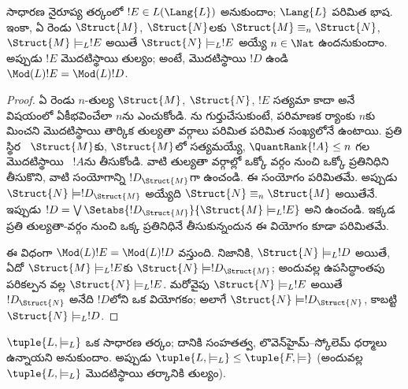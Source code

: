 \documentclass[../../../include/open-logic-section]{subfiles}
\begin{document}


\begin{lem}
సాధారణ నైరూప్య తర్కంలో $!E\in L(\Lang{L})$
అనుకుందాం; $\Lang{L}$ పరిమిత భాష. ఇంకా, ఏ రెండు
 $\Struct{M}$, $\Struct{N}$లకు
$\Struct{M}\equiv_n\Struct{N}$, $\Struct{M}\models_L!E$ అయితే
$\Struct{N}\models_L!E$ అయ్యే $n\in\Nat$ ఉందనుకుందాం. అప్పుడు $!E$
మొదటిస్థాయి  తుల్యం; అంటే,
మొదటిస్థాయి $!D$ ఉండి $\Mod(L){!E}=\Mod(L){!D}$.
\end{lem}

\begin{proof}
ఏ రెండు $n$-తుల్య 
$\Struct{M}$, $\Struct{N}$, $!E$ సత్యమా కాదా అనే విషయంలో
ఏకీభవించేలా $n$ను ఎంచుకోండి. ను
గుర్తుచేసుకుంటే, పరిమాణక ర్యాంకు $n$కు మించని మొదటిస్థాయి
 తార్కిక తుల్యతా వర్గాలు పరిమిత  పరిమిత సంఖ్యలోనే ఉంటాయి. ప్రతి స్థిర
~$\Struct{M}$కు, $\Struct{M}$లో
సత్యమయ్యే, $\QuantRank{!A}\le n$ గల మొదటిస్థాయి
~$!A$ను తీసుకోండి. వాటి తుల్యతా వర్గాల్లో
ఒక్కో వర్గం నుంచి ఒక్కో ప్రతినిధిని తీసుకొని, వాటి సంయోగాన్ని $!D_{\Struct{M}}$గా ఉంచండి.
ఈ సంయోగం పరిమితమే. అప్పుడు $\Struct{N}\models!D_{\Struct{M}}$
అయ్యేది $\Struct{N}\equiv_n\Struct{M}$ అయితేనే.
ఇప్పుడు $!D=\textstyle\bigvee
\Setabs{!D_{\Struct{M}}}{\Struct{M}\models_L!E}$ అని ఉంచండి. ఇక్కడ
ప్రతి తుల్యతా-వర్గం నుంచి ఒక్క ప్రతినిధినే తీసుకున్నందున ఈ వియోగం కూడా
పరిమితమే.

ఈ విధంగా $\Mod(L){!E}=\Mod(L){!D}$ వస్తుంది. నిజానికి,
$\Struct{N}\models_L!D$ అయితే, ఏదో $\Struct{M}\models_L!E$కు
$\Struct{N}\models!D_{\Struct{M}}$; అందువల్ల
  ఉపసిద్ధాంతపు పరికల్పన వల్ల $\Struct{N}\models_L!E$. మరోవైపు
  $\Struct{N}\models_L!E$ అయితే
$!D_{\Struct{N}}$ అనేది $!D$లోని ఒక వియోగకం; అలాగే
$\Struct{N}\models!D_{\Struct{N}}$, కాబట్టి
$\Struct{N}\models_L!D$.
\end{proof}

\begin{thm}[లిండ్‌స్ట్రోమ్ సిద్ధాంతం]
   $\tuple{L,\models_L}$ ఒక సాధారణ తర్కం; దానికి
  సంహతత్వ, లొవెన్‌హైమ్--స్కోలెమ్ ధర్మాలు ఉన్నాయని అనుకుందాం. అప్పుడు
  $\tuple{L,\models_L}\le\tuple{F,\models}$ (అందువల్ల
  $\tuple{L,\models_L}$ మొదటిస్థాయి తర్కానికి తుల్యం).
\end{thm}
\end{document}

